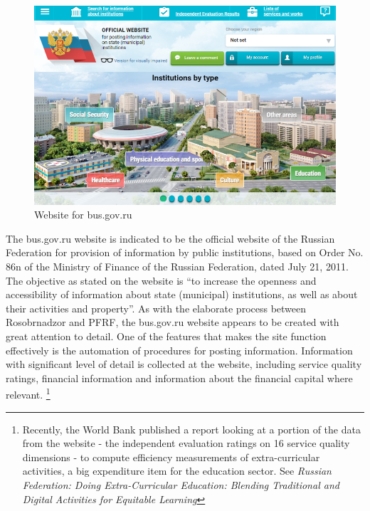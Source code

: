 \documentclass[alpha-refs]{wiley-article-05g}
\begin{document}
\begin{center}
	\begin{figure}[htbp!]
\begin{minipage}[b]{1\linewidth}
			\centering
			\hspace*{-0.1in}
         \includegraphics[scale=0.4, width=5.6in, frame]{busg_cap1c.png}
		\end{minipage}
			\caption{Website for bus.gov.ru}\label{fig:1.2}
	\end{figure}
\end{center}

\vspace{-0.2in}

The bus.gov.ru website is indicated to be the official website of the Russian Federation for provision of information by public institutions, based on Order No. 86n of the Ministry of Finance of the Russian Federation, dated July 21, 2011. The objective as stated on the website is ``to increase the openness and accessibility of information about state (municipal) institutions, as well as about their activities and property''. As with the elaborate process between Rosobrnadzor and PFRF, the bus.gov.ru website appears to be created with great attention to detail. One of the features that makes the site function effectively is the automation of procedures for posting information. Information with significant level of detail is collected at the website, including service quality ratings, financial information and information about the financial capital where relevant. \footnote{Recently, the World Bank published a report looking at a portion of the data from the website - the independent evaluation ratings on 16 service quality dimensions - to compute efficiency measurements of extra-curricular activities, a big expenditure item for the education sector. See \textit{Russian Federation: Doing Extra-Curricular Education: Blending Traditional and Digital Activities for Equitable Learning}}
\end{document}

